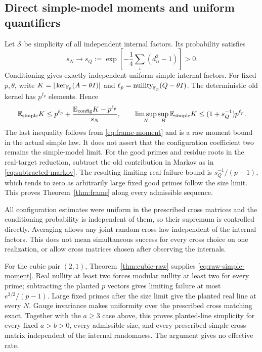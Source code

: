 \subsection{Direct simple-model moments and uniform quantifiers}
Let $\mathcal S$ be simplicity of all independent internal factors.
Its probability satisfies
\[
 s_N\longrightarrow s_Q:=
 \exp\!\left[-\frac14\sum_i(d_{ii}^2-1)\right]>0.
\]
Conditioning gives exactly independent uniform simple internal
factors. For fixed $p,\theta$, write
$K=|\ker_{\mathbb F_p}(A-\theta I)|$ and
$\ell_p=\operatorname{nullity}_{\mathbb F_p}(Q-\theta I)$. The deterministic old kernel
has $p^{\ell_p}$ elements. Hence
\begin{equation}\label{eq:frame-simple-moment}
 \mathbb E_{\rm simple}K
 \le p^{\ell_p}+
       \frac{\mathbb E_{\rm config}K-p^{\ell_p}}{s_N},\qquad
 \limsup_N\sup_B\mathbb E_{\rm simple}K
 \le(1+s_Q^{-1})p^{\ell_p}.
\end{equation}
The last inequality follows from \eqref{eq:frame-moment} and is a
raw moment bound in the actual simple law. It does not assert that
the configuration coefficient two remains the simple-model limit.
For the good primes and residue roots in the real-target reduction,
subtract the old contribution in Markov as in
\eqref{eq:subtracted-markov}. The resulting limiting real failure
bound is $s_Q^{-1}/(p-1)$, which tends to zero as arbitrarily large
fixed good primes follow the size limit. This proves
Theorem~\ref{thm:frame} along every admissible sequence.

All configuration estimates were uniform in the prescribed cross
matrices and the conditioning probability is independent of them,
so their supremum is controlled directly. Averaging allows any joint
random cross law independent of the internal factors. This does not
mean simultaneous success for every cross choice on one realization,
or allow cross matrices chosen after observing the internals.

For the cubic pair $(2,1)$, Theorem~\ref{thm:cubic-raw} supplies
\eqref{eq:raw-simple-moment}. Real nullity at least two forces
modular nullity at least two for every prime; subtracting the planted
$p$ vectors gives limiting failure at most $e^{3/2}/(p-1)$.
Large fixed primes after the size limit give the planted real line
at every $N$. Gauge invariance makes uniformity over the prescribed
cross matching exact. Together with the $a\ge3$ case above, this
proves planted-line simplicity for every fixed $a>b>0$, every
admissible size, and every prescribed simple cross matrix independent
of the internal randomness. The argument gives no effective rate.

